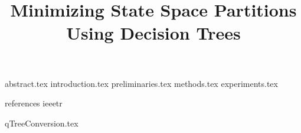 \documentclass [
  letterpaper,
  10 pt,
  conference
] {ieeeconf}
\title {Minimizing State Space Partitions Using Decision Trees}
\author {%
  \authorblockN {Andreas Holck Høeg-Petersen}
  \authorblockA {Aalborg University\\ Denmark}
  \and
  \authorblockN {Kim Guldstrand Larsen}
  \authorblockA {Aalborg University\\ Denmark}
  \and
  \authorblockN {Peter Gjøl Jensen}
  \authorblockA {Aalborg University\\ Denmark}
  \and
  \authorblockN {Andrzej Wąsowski}
  \authorblockA {IT University of Copenhagen\\ Denmark}
}
\begin{document}
\maketitle

 {abstract.tex}
 {introduction.tex}
 {preliminaries.tex}
 {methods.tex}
 {experiments.tex}

\newpage

 {references}
 {ieeetr}

\appendix

 {qTreeConversion.tex}
\end{document}
